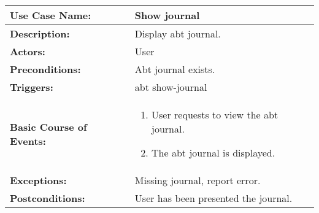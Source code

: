 
\begin{tabularx}{\linewidth}{|l|X|}
\hline
\textbf{Use Case Name:} & \textbf{Show journal} \\
\hline
\textbf{Description:} & Display abt journal. \\
\hline
\textbf{Actors:} & User \\
\hline
\textbf{Preconditions:} & Abt journal exists. \\
\hline
\textbf{Triggers:} & abt show-journal \\
\hline
\textbf{Basic Course of Events:} & 
\begin{minipage}{\linewidth} 
  \vspace{0.05em}
  \begin{enumerate}
    \item User requests to view the abt journal.
    \item The abt journal is displayed.
  \end{enumerate}
  \vspace{0.05em}
\end{minipage}
\\
\hline 
\textbf{Exceptions:} & Missing journal, report error. \\
\hline 
\textbf{Postconditions:} &
User has been presented the journal. \\
\hline
\end{tabularx}



